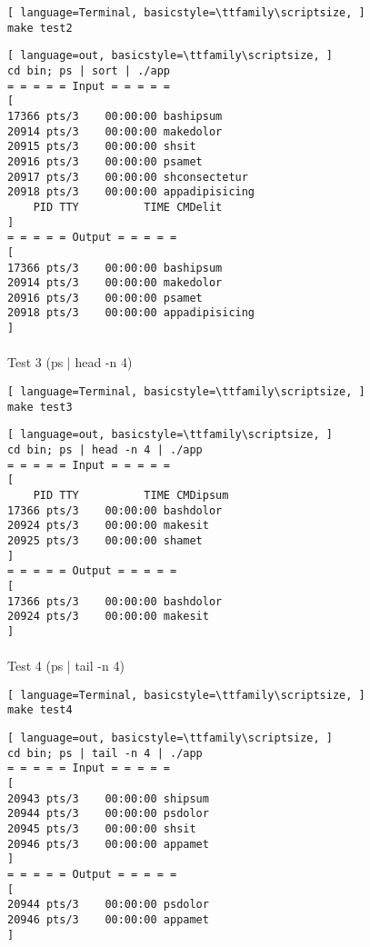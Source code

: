 \begin{lstlisting}[ language=Terminal, basicstyle=\ttfamily\scriptsize, ]
make test2
\end{lstlisting}

\begin{lstlisting}[ language=out, basicstyle=\ttfamily\scriptsize, ]
cd bin; ps | sort | ./app
= = = = = Input = = = = =
[
17366 pts/3    00:00:00 bashipsum
20914 pts/3    00:00:00 makedolor
20915 pts/3    00:00:00 shsit
20916 pts/3    00:00:00 psamet
20917 pts/3    00:00:00 shconsectetur
20918 pts/3    00:00:00 appadipisicing
    PID TTY          TIME CMDelit
]
= = = = = Output = = = = =
[
17366 pts/3    00:00:00 bashipsum
20914 pts/3    00:00:00 makedolor
20916 pts/3    00:00:00 psamet
20918 pts/3    00:00:00 appadipisicing
]
\end{lstlisting}

\paragraph{}
Test 3 (ps | head -n 4)

\begin{lstlisting}[ language=Terminal, basicstyle=\ttfamily\scriptsize, ]
make test3
\end{lstlisting}

\begin{lstlisting}[ language=out, basicstyle=\ttfamily\scriptsize, ]
cd bin; ps | head -n 4 | ./app
= = = = = Input = = = = =
[
    PID TTY          TIME CMDipsum
17366 pts/3    00:00:00 bashdolor
20924 pts/3    00:00:00 makesit
20925 pts/3    00:00:00 shamet
]
= = = = = Output = = = = =
[
17366 pts/3    00:00:00 bashdolor
20924 pts/3    00:00:00 makesit
]
\end{lstlisting}

\paragraph{}
Test 4 (ps | tail -n 4)

\begin{lstlisting}[ language=Terminal, basicstyle=\ttfamily\scriptsize, ]
make test4
\end{lstlisting}

\begin{lstlisting}[ language=out, basicstyle=\ttfamily\scriptsize, ]
cd bin; ps | tail -n 4 | ./app
= = = = = Input = = = = =
[
20943 pts/3    00:00:00 shipsum
20944 pts/3    00:00:00 psdolor
20945 pts/3    00:00:00 shsit
20946 pts/3    00:00:00 appamet
]
= = = = = Output = = = = =
[
20944 pts/3    00:00:00 psdolor
20946 pts/3    00:00:00 appamet
]
\end{lstlisting}
